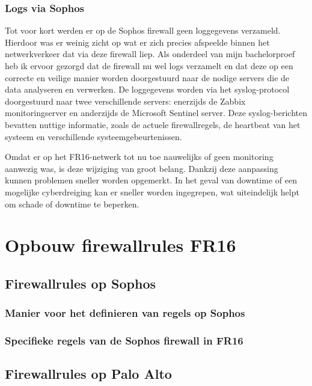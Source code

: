 \subsection{Logs via Sophos}
Tot voor kort werden er op de Sophos firewall geen loggegevens verzameld. Hierdoor was er weinig zicht op wat er zich precies afspeelde binnen het netwerkverkeer dat via deze firewall liep. Als onderdeel van mijn bachelorproef heb ik ervoor gezorgd dat de firewall nu wel logs verzamelt en dat deze op een correcte en veilige manier worden doorgestuurd naar de nodige servers die de data analyseren en verwerken.
De loggegevens worden via het syslog-protocol doorgestuurd naar twee verschillende servers: enerzijds de Zabbix monitoringserver en anderzijds de Microsoft Sentinel server. Deze syslog-berichten bevatten nuttige informatie, zoals de actuele firewallregels, de heartbeat van het systeem en verschillende systeemgebeurtenissen.

\vspace{5mm}
Omdat er op het FR16-netwerk tot nu toe nauwelijks of geen monitoring aanwezig was, is deze wijziging van groot belang. Dankzij deze aanpassing kunnen problemen sneller worden opgemerkt. In het geval van downtime of een mogelijke cyberdreiging kan er sneller worden ingegrepen, wat uiteindelijk helpt om schade of downtime te beperken.








\chapter{Opbouw firewallrules FR16}

\section{Firewallrules op Sophos}
\subsection{Manier voor het definieren van regels op Sophos}
\subsection{Specifieke regels van de Sophos firewall in FR16}

\section{Firewallrules op Palo Alto}
